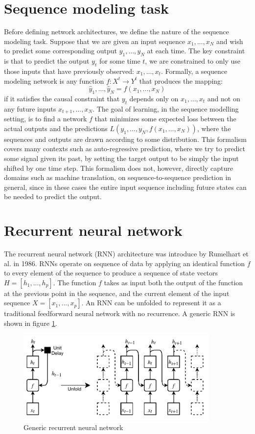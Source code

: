\section{Sequence modeling task}
Before defining network architectures, we define the nature of the sequence modeling task. Suppose that we are given an input sequence $x_1,...,x_N$ and wish to predict some corresponding output $y_1,...,y_N$ at each time. The key constraint is that to predict the output $y_t$ for some time $t$, we are constrained to only use those inputs that have previously observed: $x_1,...,x_t$. Formally, a sequence modeling network is any function $f:X^t \rightarrow Y^t$ that produces the mapping:
$$\hat{y}_1,...,\hat{y}_N = f(x_1,...,x_N)$$
if it satisfies the causal constraint that $y_t$ depends only on $x_1,...,x_t$ and not on any future inputs $x_{t+1},...,x_N$. The goal of learning, in the sequence modelling setting, is to find a network $f$ that minimizes some expected loss between the actual outputs and the predictions $L(y_1,...,y_N,f(x_1,...,x_N))$, where the sequences and outputs are drawn according to some distribution.
This formalism covers many contexts such as auto-regressive prediction, where we try to predict some signal given its past, by setting the target output to be simply the input shifted by one time step. This formalism does not, however, directly capture domains such as machine translation, on sequence-to-sequence prediction in general, since in these cases the entire input sequence including future states can be needed to predict the output.

\section{Recurrent neural network}
The recurrent neural network (RNN) architecture was introduce by Rumelhart et al. \cite{rumelhart1986learning} in 1986. RNNs operate on sequence of data by applying an identical function $f$ to every element of the sequence to produce a sequence of state vectors $H = [h_1,...,h_p]$. The function $f$ takes as input both the output of the function at the previous point in the sequence, and the current element of the input sequence $X=[x_1,...,x_p]$. An RNN can be unfolded to represent it as a traditional feedforward neural network with no recurrence. A generic RNN is shown in figure \ref{fig:generic_rnn}.

\begin{figure}[h]
    \centering
    \includegraphics[width=10cm]{cap3/generic_rnn.png}
    \caption{Generic recurrent neural network}
    \label{fig:generic_rnn}
\end{figure}

